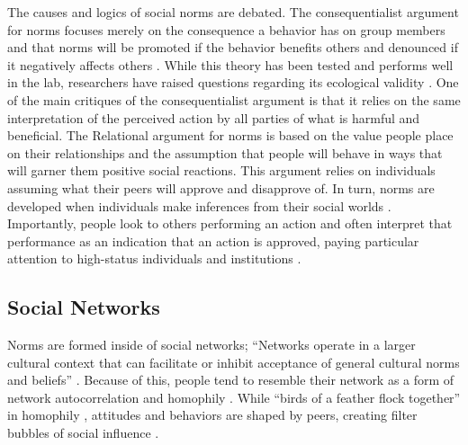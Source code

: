 The causes and logics of social norms are debated. The consequentialist argument
for norms focuses merely on the consequence a behavior has on group members and
that norms will be promoted if the behavior benefits others and denounced if it
negatively affects others \citep{ullmannmargalitEmergenceNorms1977}. While this
theory has been tested and performs well in the lab, researchers have raised
questions regarding its ecological validity
\citep{horneNormsIntegratedFramework2020}. One of the main critiques of the
consequentialist argument is that it relies on the same interpretation of the
perceived action by all parties of what is harmful and beneficial. The
Relational argument for norms is based on the value people place on their
relationships and the assumption that people will behave in ways that will
garner them positive social reactions. This argument relies on individuals
assuming what their peers will approve and disapprove of. In turn, norms are
developed when individuals make inferences from their social worlds
\citep{fryeCulturalMeaningsAggregation2017}. Importantly, people look to others
performing an action and often interpret that performance as an indication that
an action is approved, paying particular attention to high-status individuals
and institutions \citep{robalinoPeerEffectsAdolescent2018,
tankardEffectSupremeCourt2017}.

\subsection{Social Networks}

Norms are formed inside of social networks; ``Networks operate in a larger
cultural context that can facilitate or inhibit acceptance of general cultural
norms and beliefs'' \citep[][p. 44]{pescosolidoDurkheimSuicideReligion1989}.
Because of this, people tend to resemble their network as a form of network
autocorrelation and homophily \citep{dellapostaWhyLiberalsDrink2015}. While
``birds of a feather flock together'' in homophily
\citep{mcphersonBirdsFeatherHomophily2001}, attitudes and behaviors are shaped
by peers, creating filter bubbles of social influence
\citep{dellapostaWhyLiberalsDrink2015}.

